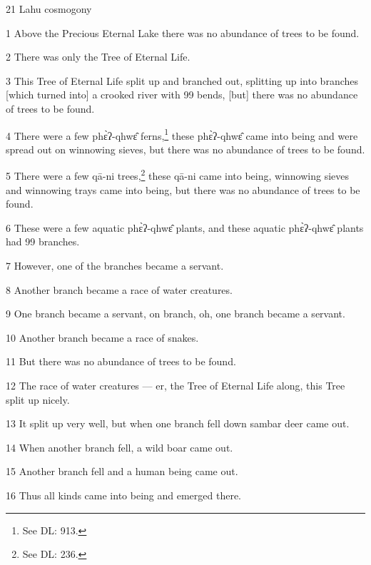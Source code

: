 
21 Lahu cosmogony

1 Above the Precious Eternal Lake there was no abundance of trees to be found.

2 There was only the Tree of Eternal Life.

3 This Tree of Eternal Life split up and branched out, splitting up into branches
[which turned into] a crooked river with 99 bends, [but] there was no abundance
of trees to be found.

4 There were a few phɛ̀ʔ-qhwɛ̂ ferns,\footnote{See DL: 913.} these phɛ̀ʔ-qhwɛ̂ came into
being and were spread out on winnowing sieves, but there was no abundance of trees
to be found.

5 There were a few qā-ni trees,\footnote{See DL: 236.} these qā-ni came into being, winnowing sieves
and winnowing trays came into being, but there was no abundance of trees to be
found.

6 These were a few aquatic phɛ̀ʔ-qhwɛ̂ plants, and these aquatic phɛ̀ʔ-qhwɛ̂
plants had 99 branches.

7 However, one of the branches became a servant.

8 Another branch became a race of water creatures.

9 One branch became a servant, on branch, oh, one branch became a servant.

10 Another branch became a race of snakes.

11 But there was no abundance of trees to be found.

12 The race of water creatures --- er, the Tree of Eternal Life along, this Tree
split up nicely.

13 It split up very well, but when one branch fell down sambar deer came out.

14 When another branch fell, a wild boar came out.

15 Another branch fell and a human being came out.

16 Thus all kinds came into being and emerged there.

